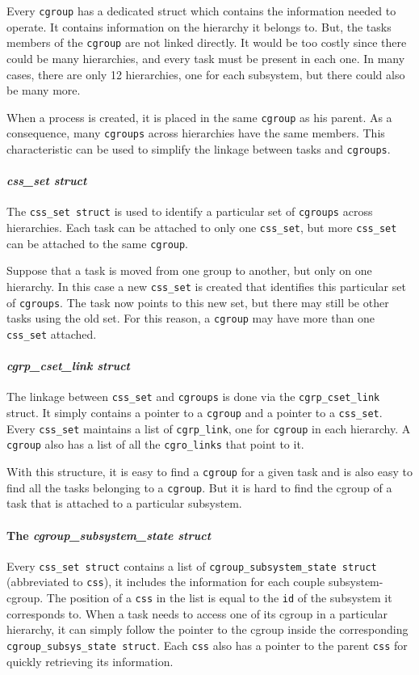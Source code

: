 Every \verb|cgroup| has a dedicated struct which contains the information needed to operate. It contains information on the hierarchy it belongs to. But, the tasks members of the \verb|cgroup| are not linked directly. It would be too costly since there could be many hierarchies, and every task must be present in each one. In many cases, there are only 12 hierarchies, one for each subsystem, but there could also be many more. 

When a process is created, it is placed in the same \verb|cgroup| as his parent. As a consequence, many \verb|cgroups| across hierarchies have the same members. This characteristic can be used to simplify the linkage between tasks and \verb|cgroups|.

\paragraph{\textit{css\_set struct}}
The \verb|css_set struct| is used to identify a particular set of \verb|cgroups| across hierarchies. Each task can be attached to only one \verb|css_set|, but more \verb|css_set| can be attached to the same \verb|cgroup|. 

Suppose that a task is moved from one group to another, but only on one hierarchy. In this case a new \verb|css_set| is created that identifies this particular set of \verb|cgroups|. The task now points to this new set, but there may still be other tasks using the old set. For this reason, a \verb|cgroup| may have more than one \verb|css_set| attached.

\paragraph{\textit{cgrp\_cset\_link struct}}
The linkage between \verb|css_set| and \verb|cgroups| is done via the \verb|cgrp_cset_link| struct. It simply contains a pointer to a \verb|cgroup| and a pointer to a \verb|css_set|. Every \verb|css_set| maintains a list of \verb|cgrp_link|, one for \verb|cgroup| in each hierarchy. A \verb|cgroup| also has a list of all the \verb|cgro_links| that point to it. 

With this structure, it is easy to find a \verb|cgroup| for a given task and is also easy to find all the tasks belonging to a \verb|cgroup|. But it is hard to find the cgroup of a task that is attached to a particular subsystem.

\paragraph{The \textit{cgroup\_subsystem\_state struct}}
Every \verb|css_set struct| contains a list of \verb|cgroup_subsystem_state struct| (abbreviated to \verb|css|), it includes the information for each couple subsystem-cgroup.
The position of a \verb|css| in the list is equal to the \verb|id| of the subsystem it corresponds to. When a task needs to access one of its cgroup in a particular hierarchy, it can simply follow the pointer to the cgroup inside the corresponding \verb|cgroup_subsys_state struct|. Each \verb|css| also has a pointer to the parent \verb|css| for quickly retrieving its information.

